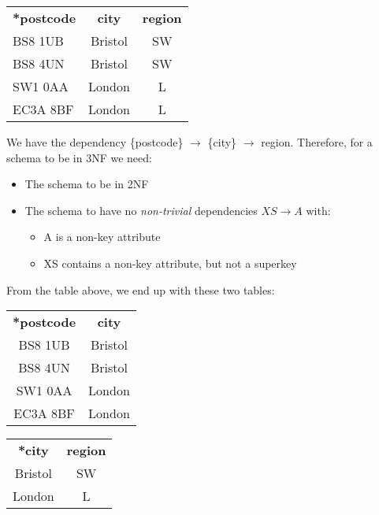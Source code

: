 \documentclass[11pt,a4paper,titlepage,dvipsnames,cmyk]{scrartcl}
\begin{document}
\begin{center}
    \begin{tabular}{|l|c|c|}
        \hline
        \multicolumn{1}{|c|}{\textbf{*postcode}} & \textbf{city} &
        \textbf{region} \\ \hhline{|=|=|=|}
        BS8 1UB & Bristol & SW \\ \hline
        BS8 4UN & Bristol & SW \\ \hline
        SW1 0AA & London & L \\ \hline
        EC3A 8BF & London & L \\ \hline
    \end{tabular}
\end{center}

\begin{minipage}{\textwidth}
We have the dependency \{postcode\} $\rightarrow$ \{city\} $\rightarrow$
region. Therefore, for a schema to be in 3NF we need:
\begin{itemize}
    \item The schema to be in 2NF
    \item The schema to have no \textit{non-trivial} dependencies $XS
        \rightarrow A$ with:
        \begin{itemize}
            \item A is a non-key attribute
            \item XS contains a non-key attribute, but not a superkey
        \end{itemize}
\end{itemize}
\end{minipage}

From the table above, we end up with these two tables:

\begin{center}
    \begin{tabular}{|c|c|}
        \hline
        \multicolumn{1}{|c|}{\textbf{*postcode}} & \textbf{city} \\
        \hhline{|=|=|}
        BS8 1UB & Bristol \\ \hline
        BS8 4UN & Bristol \\ \hline
        SW1 0AA & London \\ \hline
        EC3A 8BF & London \\ \hline
    \end{tabular}
    \quad
    \begin{tabular}{|c|c|}
        \hline
        \multicolumn{1}{|c|}{\textbf{*city}} & \textbf{region} \\
        \hhline{|=|=|}
        Bristol & SW \\ \hline
        London & L \\ \hline
    \end{tabular}
\end{center}
\end{document}

